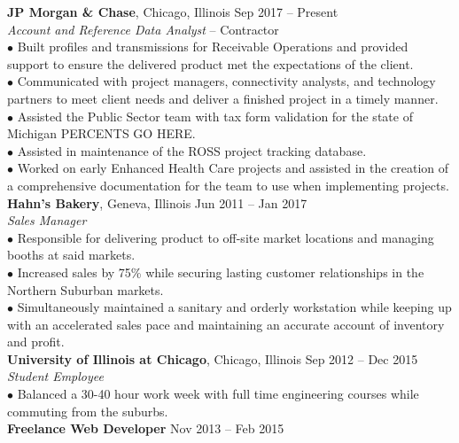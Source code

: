\documentclass[11pt]{article}
\newenvironment{sectionbody}{\begin{adjustwidth}{6mm}{}}{\end{adjustwidth}}
\begin{document}
\begin{sectionbody}
{\bf JP Morgan \& Chase}, Chicago, Illinois \hfill Sep 2017 -- Present \\
    \textit{Account and Reference Data Analyst} -- Contractor \\
$\bullet$ Built profiles and transmissions for Receivable Operations and provided support to ensure the delivered product met the expectations of the client. \\
$\bullet$ Communicated with project managers, connectivity analysts, and technology partners to meet client needs and deliver a finished project in a timely manner. \\
$\bullet$ Assisted the Public Sector team with tax form validation for the state of Michigan PERCENTS GO HERE. \\
$\bullet$ Assisted in maintenance of the ROSS project tracking database. \\
$\bullet$ Worked on early Enhanced Health Care projects and assisted in the creation of a comprehensive documentation for the team to use when implementing projects. \\
{\bf Hahn's Bakery}, Geneva, Illinois \hfill Jun 2011 -- Jan 2017 \\
\textit{Sales Manager} \\
$\bullet$ Responsible for delivering product to off-site market locations and managing booths at said markets. \\
$\bullet$ Increased sales by 75\% while securing lasting customer relationships in the Northern Suburban markets. \\
$\bullet$ Simultaneously maintained a sanitary and orderly workstation while keeping up with an accelerated sales pace and maintaining an accurate account of inventory and profit. \\
{\bf University of Illinois at Chicago}, Chicago, Illinois \hfill Sep 2012 -- Dec 2015 \\
\textit{Student Employee} \\
$\bullet$ Balanced a 30-40 hour work week with full time engineering courses while commuting from the suburbs. \\
{\bf Freelance Web Developer} \hfill Nov 2013 -- Feb 2015
\end{sectionbody}
\end{document}
